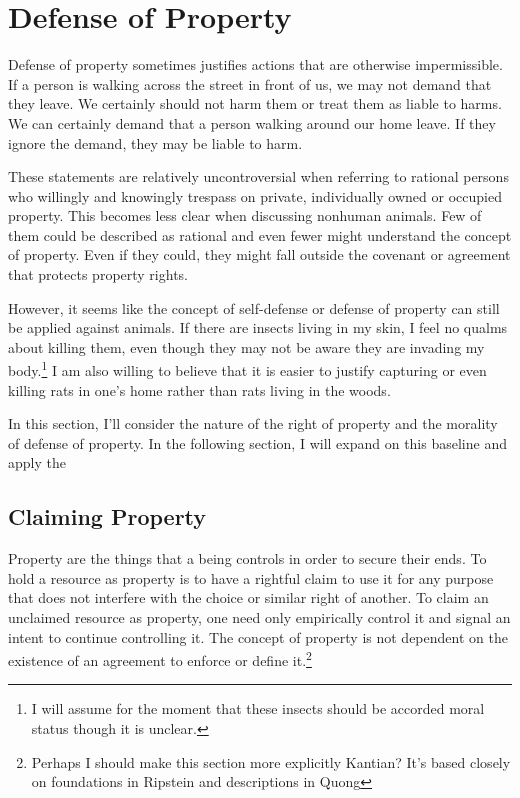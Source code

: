 \section{Defense of Property}

	Defense of property sometimes justifies actions that are otherwise
	impermissible. If a person is walking across the street in front of us, we
	may not demand that they leave. We certainly should not harm them or treat
	them as liable to harms.  We can certainly demand that a person walking
	around our home leave. If they ignore the demand, they may be liable to
	harm.

	These statements are relatively uncontroversial when referring to rational
	persons who willingly and knowingly trespass on private, individually owned
	or occupied property. This becomes less clear when discussing nonhuman
	animals. Few of them could be described as rational and even fewer might
	understand the concept of property. Even if they could, they might fall
	outside the covenant or agreement that protects property rights.

	However, it seems like the concept of self-defense or defense of
	property can still be applied against animals.  If there are insects living
	in my skin, I feel no qualms about killing them, even though they may not
	be aware they are invading my body.\footnote{I will assume for the moment
	that these insects should be accorded moral status though it is unclear.}
	I am also willing to believe that it is easier to justify capturing or even
	killing rats in one’s home rather than rats living in the woods.

	In this section, I’ll consider the nature of the right of property and the
	morality of defense of property. In the following section, I will expand
	on this baseline and apply the 

	\subsection{Claiming Property}

	Property are the things that a being controls in order to secure their
	ends.  To hold a resource as property is to have a rightful claim to use it
	for any purpose that does not interfere with the choice or similar right of
	another.  To claim an unclaimed resource as property, one need only
	empirically control it and signal an intent to continue controlling it.
	The concept of property is not dependent on the existence of an agreement to
	enforce or define it.\footnote{Perhaps I should make this section more
	explicitly Kantian? It’s based closely on foundations in Ripstein and
	descriptions in Quong}

